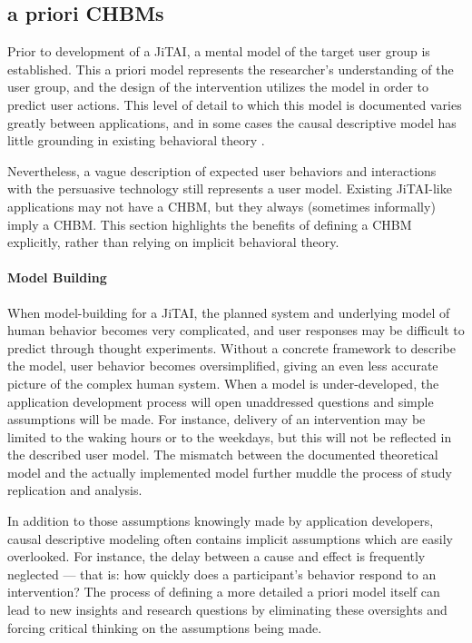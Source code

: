 \documentclass[runningheads,a4paper]{llncs}
\begin{document}
\subsection{a priori CHBMs}
Prior to development of a JiTAI, a mental model of the target user group is established.
This a priori model represents the researcher's understanding of the user group, and the design of the intervention utilizes the model in order to predict user actions.
This level of detail to which this model is documented varies greatly between applications, and in some cases the causal descriptive model has little grounding in existing behavioral theory \cite{prestwich2014does}.


Nevertheless, a vague description of expected user behaviors and interactions with the persuasive technology still represents a user model.
Existing JiTAI-like applications may not have a CHBM, but they always (sometimes informally) imply a CHBM.
This section highlights the benefits of defining a CHBM explicitly, rather than relying on implicit behavioral theory.
\paragraph{Model Building}
When model-building for a JiTAI, the planned system and underlying model of human behavior becomes very complicated, and user responses may be difficult to predict through thought experiments.
Without a concrete framework to describe the model, user behavior becomes oversimplified, giving an even less accurate picture of the complex human system.
When a model is under-developed, the application development process will open unaddressed questions and simple assumptions will be made.
For instance, delivery of an intervention may be limited to the waking hours or to the weekdays, but this will not be reflected in the described user model.
The mismatch between the documented theoretical model and the actually implemented model further muddle the process of study replication and analysis.

In addition to those assumptions knowingly made by application developers, causal descriptive modeling often contains implicit assumptions which are easily overlooked.
For instance, the delay between a cause and effect is frequently neglected --- that is: how quickly does a participant's behavior respond to an intervention?
The process of defining a more detailed a priori model itself can lead to new insights and research questions by eliminating these oversights and forcing critical thinking on the assumptions being made.
\end{document}
